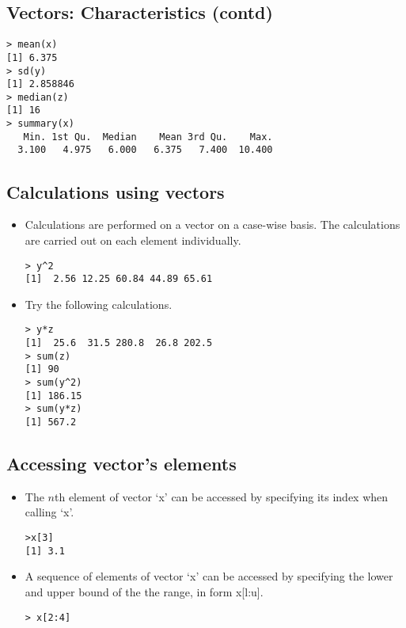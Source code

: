 \subsection{Vectors: Characteristics (contd)}

\begin{verbatim}
> mean(x)
[1] 6.375
> sd(y)
[1] 2.858846
> median(z)
[1] 16
> summary(x)
   Min. 1st Qu.  Median    Mean 3rd Qu.    Max.
  3.100   4.975   6.000   6.375   7.400  10.400
\end{verbatim}


\subsection{Calculations using vectors}

\begin{itemize}
\item Calculations are performed on a vector on a case-wise basis.
The calculations are carried out on each element individually.
\begin{verbatim}
> y^2
[1]  2.56 12.25 60.84 44.89 65.61
\end{verbatim}

\end{itemize}
\begin{itemize}
\item Try the following calculations.
\begin{verbatim}
> y*z
[1]  25.6  31.5 280.8  26.8 202.5
> sum(z)
[1] 90
> sum(y^2)
[1] 186.15
> sum(y*z)
[1] 567.2
\end{verbatim}
\end{itemize}

\subsection{Accessing vector's elements}

\begin{itemize}
\item The $n$th element of vector `x' can be accessed by
specifying its index when calling `x'.
\begin{verbatim}
>x[3]
[1] 3.1
\end{verbatim}

\item A sequence of  elements of vector `x' can be accessed by
specifying the lower and upper bound of the the range, in form
x[l:u].
\begin{verbatim}
> x[2:4]
\end{verbatim}
\end{itemize}



